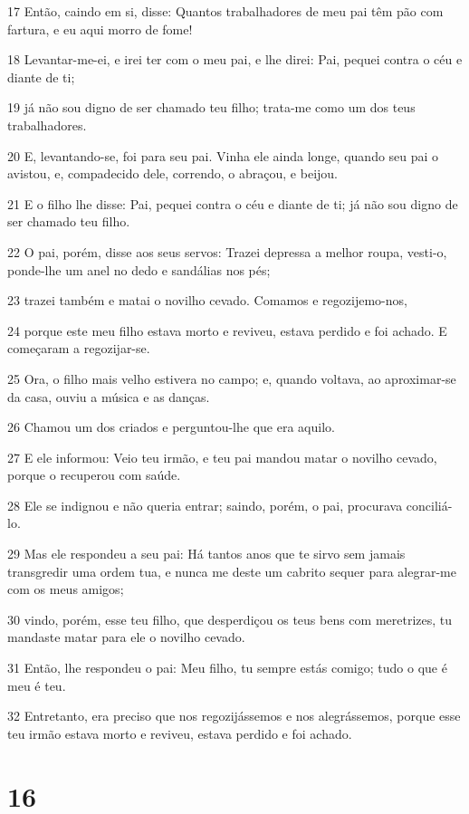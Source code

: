 \par 17 Então, caindo em si, disse: Quantos trabalhadores de meu pai têm pão com fartura, e eu aqui morro de fome!
\par 18 Levantar-me-ei, e irei ter com o meu pai, e lhe direi: Pai, pequei contra o céu e diante de ti;
\par 19 já não sou digno de ser chamado teu filho; trata-me como um dos teus trabalhadores.
\par 20 E, levantando-se, foi para seu pai. Vinha ele ainda longe, quando seu pai o avistou, e, compadecido dele, correndo, o abraçou, e beijou.
\par 21 E o filho lhe disse: Pai, pequei contra o céu e diante de ti; já não sou digno de ser chamado teu filho.
\par 22 O pai, porém, disse aos seus servos: Trazei depressa a melhor roupa, vesti-o, ponde-lhe um anel no dedo e sandálias nos pés;
\par 23 trazei também e matai o novilho cevado. Comamos e regozijemo-nos,
\par 24 porque este meu filho estava morto e reviveu, estava perdido e foi achado. E começaram a regozijar-se.
\par 25 Ora, o filho mais velho estivera no campo; e, quando voltava, ao aproximar-se da casa, ouviu a música e as danças.
\par 26 Chamou um dos criados e perguntou-lhe que era aquilo.
\par 27 E ele informou: Veio teu irmão, e teu pai mandou matar o novilho cevado, porque o recuperou com saúde.
\par 28 Ele se indignou e não queria entrar; saindo, porém, o pai, procurava conciliá-lo.
\par 29 Mas ele respondeu a seu pai: Há tantos anos que te sirvo sem jamais transgredir uma ordem tua, e nunca me deste um cabrito sequer para alegrar-me com os meus amigos;
\par 30 vindo, porém, esse teu filho, que desperdiçou os teus bens com meretrizes, tu mandaste matar para ele o novilho cevado.
\par 31 Então, lhe respondeu o pai: Meu filho, tu sempre estás comigo; tudo o que é meu é teu.
\par 32 Entretanto, era preciso que nos regozijássemos e nos alegrássemos, porque esse teu irmão estava morto e reviveu, estava perdido e foi achado.

\chapter{16}

